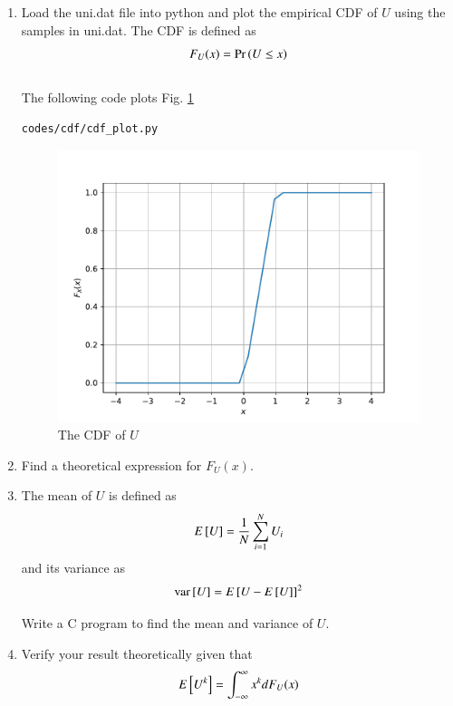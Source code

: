 \begin{enumerate}[label=\thesubsection.\arabic*
,ref=\thesection.\theenumi]
%
\item
Load the uni.dat file into python and plot the empirical CDF of $U$ using the samples in uni.dat. The CDF is defined as
\begin{align}
F_{U}(x) = \Pr\left(U \le x\right)
\end{align}
\\
\solution  The following code plots Fig. \ref{fig:uni_cdf}
\begin{lstlisting}
codes/cdf/cdf_plot.py
\end{lstlisting}
\begin{figure}
\centering
\includegraphics[width=\columnwidth]{./figs/cdf/uni_cdf}
\caption{The CDF of $U$}
\label{fig:uni_cdf}
\end{figure}



%
\item
Find a  theoretical expression for $F_{U}(x)$.

\item
The mean of $U$ is defined as
%
\begin{equation}
E{}\left[U\right] = \frac{1}{N}\sum_{i=1}^{N}U_i
\end{equation}
%
and its variance as
%
\begin{equation}
\text{var}{}\left[U\right] = E{}\left[U- E{}\left[U\right]\right]^2 
\end{equation}

Write a C program to  find the mean and variance of $U$. 
\item Verify your result theoretically given that
%
\begin{equation}
E{}\left[U^k\right] = \int_{-\infty}^{\infty}x^kdF_{U}(x)
\end{equation}

\end{enumerate}



